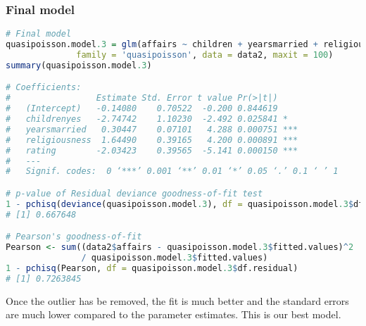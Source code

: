 \documentclass[border=5mm, convert, usenames, dvipsnames,beamer]{standalone}
\begin{document}
\begin{frame}[ fragile]{}
\frametitle{Final model}

\footnotesize
\vspace{10mm}
\noindent

\par


\tiny
\begin{lstlisting}[language=R]
# Final model
quasipoisson.model.3 = glm(affairs ~ children + yearsmarried + religiousness + rating,
              family = 'quasipoisson', data = data2, maxit = 100)
summary(quasipoisson.model.3)

# Coefficients:
#                 Estimate Std. Error t value Pr(>|t|)    
#   (Intercept)   -0.14080    0.70522  -0.200 0.844619    
#   childrenyes   -2.74742    1.10230  -2.492 0.025841 *  
#   yearsmarried   0.30447    0.07101   4.288 0.000751 ***
#   religiousness  1.64490    0.39165   4.200 0.000891 ***
#   rating        -2.03423    0.39565  -5.141 0.000150 ***
#   ---
#   Signif. codes:  0 ‘***’ 0.001 ‘**’ 0.01 ‘*’ 0.05 ‘.’ 0.1 ‘ ’ 1

# p-value of Residual deviance goodness-of-fit test
1 - pchisq(deviance(quasipoisson.model.3), df = quasipoisson.model.3$df.residual)
# [1] 0.667648

# Pearson's goodness-of-fit
Pearson <- sum((data2$affairs - quasipoisson.model.3$fitted.values)^2 
               / quasipoisson.model.3$fitted.values)
1 - pchisq(Pearson, df = quasipoisson.model.3$df.residual)
# [1] 0.7263845
\end{lstlisting}
\par


\footnotesize
\noindent
Once the outlier has be removed, {\color{purple}the fit is much better} and the standard errors are much lower compared to the parameter estimates. This is our best model.
\par

\end{frame}
\end{document}

